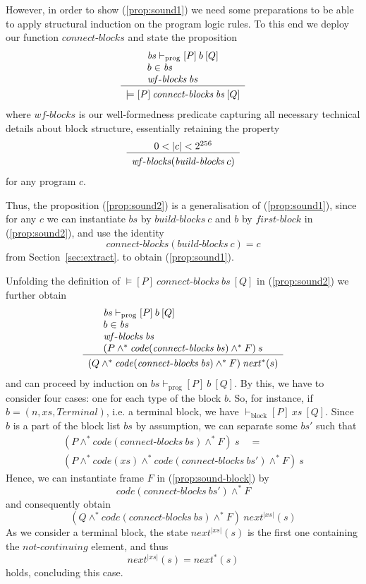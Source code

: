\documentclass[sigplan,10pt,review]{acmart}\settopmatter{printfolios=true,printccs=false,printacmref=false}
\newcommand{\sconj}{\wedge^*}
\newcommand{\tvalid}[3]{\models[#1]\:#2\:[#3]}
\newcommand{\ttrip}[5]{\mathit{#1} \vdash_{\mathrm{#2}}[#3]\:#4\:[#5]}
\newcommand{\xnext}{\mathit{next}}
\newcommand{\code}[1]{\mathit{code}(#1)}
\newcommand{\ncont}{\mathit{not\mbox{-}continuing}}
\newcommand{\RuleC}[2]{\begin{array}{c}#1\\\hline\noalign{\smallskip}#2\end{array}}
\newcommand{\bblocks}{\mathit{build\mbox{-}blocks}}
\newcommand{\cblocks}{\mathit{connect\mbox{-}blocks}}
\newcommand{\fblock}{\mathit{first\mbox{-}block}}
\newcommand{\len}[1]{|#1|}
\newcommand{\wfblocks}{\mathit{wf\mbox{-}blocks}}
\begin{document}
However, in order to show (\ref{prop:sound1}) we need some preparations to be able to apply
structural induction on the program logic rules. To this end we deploy our function $\cblocks$
and state the proposition
\begin{equation}
\label{prop:sound2}
\RuleC{\begin{array}{l}
       \ttrip{\mathit{bs}}{prog}{P}{b}{Q} \\
       b \in \mathit{bs}\\
       \wfblocks\:\mathit{bs}
       \end{array}}
{\tvalid{P}{\cblocks \: \mathit{bs}}{Q}}
\end{equation}
where $\wfblocks$ is our well-formedness predicate capturing all necessary technical details about block
structure, essentially retaining the property 
\[
\RuleC{0 < \len{c} < 2^{256}}
{\wfblocks(\bblocks \: c)}
\] 
for any program $c$. 

Thus, the proposition (\ref{prop:sound2}) is a generalisation of
(\ref{prop:sound1}), since for any $c$ we can instantiate $\mathit{bs}$ by $\bblocks \: c$ 
and $b$ by $\fblock$ in (\ref{prop:sound2}), and use the identity 
\[
\cblocks(\bblocks\:c) = c
\] 
from Section~\ref{sec:extract}.
to obtain (\ref{prop:sound1}). 

Unfolding the definition of $\tvalid{P}{\cblocks \: \mathit{bs}}{Q}$ in
(\ref{prop:sound2}) we further obtain
\begin{equation}
\label{prop:sound3}
\RuleC{\begin{array}{l}
       \ttrip{\mathit{bs}}{prog}{P}{b}{Q} \\
       b \in \mathit{bs}\\
       \wfblocks\:\mathit{bs} \\
      (P \sconj \code{\cblocks \: \mathit{bs}} \sconj F)\: s
       \end{array}}
{(Q \sconj \code{\cblocks \: \mathit{bs}} \sconj F)\: \xnext^*(s)}
\end{equation}
and can proceed by induction on $\ttrip{\mathit{bs}}{prog}{P}{b}{Q}$.
By this, we have to consider four cases: one for each type of the block $b$.
So, for instance, if $b = (n, \mathit{xs}, \mathit{Terminal})$, i.e. a terminal block,
we have $\ttrip{}{block}{P}{\mathit{xs}}{Q}$. 
Since $b$ is a part of the block list $\mathit{bs}$ by assumption, we can separate some $\mathit{bs'}$ 
such that 
\[
\begin{array}{l}
(P \sconj \code{\cblocks \: \mathit{bs}} \sconj F)\: s \quad = \\
(P \sconj \code{\mathit{xs}} \sconj \code{\cblocks \: \mathit{bs'}} \sconj F)\: s 
\end{array}
\] 
Hence, we can instantiate frame $F$ in (\ref{prop:sound-block}) by
\[
\code{\cblocks \: \mathit{bs}'} \sconj F
\]
and consequently obtain 
\[
(Q \sconj \code{\cblocks \: \mathit{bs}} \sconj F)\: \xnext^{\len{\mathit{xs}}}(s)
\]
As we consider a terminal block, the state 
$\xnext^{\len{\mathit{xs}}}(s)$ is the first one containing the $\ncont$ element, and thus 
\[
\xnext^{\len{\mathit{xs}}}(s) = \xnext^*(s)
\]
holds, concluding this case.
\end{document}
